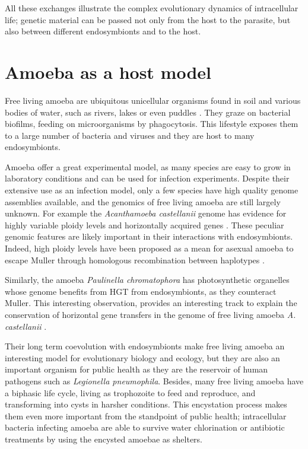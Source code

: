 All these exchanges illustrate the complex evolutionary dynamics of intracellular life; genetic material can be passed not only from the host to the parasite, but also between different endosymbionts and to the host.

\section{Amoeba as a host model}

Free living amoeba are ubiquitous unicellular organisms found in soil and various bodies of water, such as rivers, lakes \cite{johnSeasonalDistributionPathogenic1995} or even puddles \cite{sakamotoLegionellaPneumophilaRainwater2009}. They graze on bacterial biofilms, feeding on microorganisms by phagocytosis. This lifestyle exposes them to a large number of bacteria and viruses and they are host to many endosymbionts. 

Amoeba offer a great experimental model, as many species are easy to grow in laboratory conditions and can be used for infection experiments. Despite their extensive use as an infection model, only a few species have high quality genome assemblies available, and the genomics of free living amoeba are still largely unknown. For example the \textit{Acanthamoeba castellanii} genome has evidence for highly variable ploidy levels \cite{maciverAsexualAmoebaeEscape2016} and horizontally acquired genes \cite{clarkeGenomeAcanthamoebaCastellanii2013}. These peculiar genomic features are likely important in their interactions with endosymbionts. Indeed, high ploidy levels have been proposed as a mean for asexual amoeba to escape \Gls{Muller} through homologous recombination between haplotypes \cite{maciverAsexualAmoebaeEscape2016}.

Similarly, the amoeba \textit{Paulinella chromatophora} has photosynthetic organelles whose genome benefits from HGT from endosymbionts, as they counteract \Gls{Muller}. This interesting observation, provides an interesting track to explain the conservation of horizontal gene transfers in the genome of free living amoeba \textit{A. castellanii} \cite{clarkeGenomeAcanthamoebaCastellanii2013}.

Their long term coevolution with endosymbionts make free living amoeba an interesting model for evolutionary biology and ecology, but they are also an important organism for public health as they are the reservoir of human pathogens such as \textit{Legionella pneumophila}. Besides, many free living amoeba have a biphasic life cycle, living as trophozoite to feed and reproduce, and transforming into cysts in harsher conditions. This encystation process makes them even more important from the standpoint of public health; intracellular bacteria infecting amoeba are able to survive water chlorination or antibiotic treatments by using the encysted amoebae as shelters.

